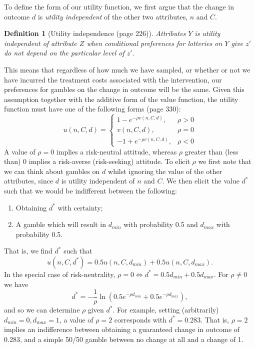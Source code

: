 \documentclass[sagev, Crown]{sagej} %
\newtheorem*{mydef}{Definition}
\begin{document}
To define the form of our utility function, we first argue that the change in outcome $d$ is \emph{utility independent} of the other two attributes, $n$ and $C$. 

\begin{mydef}[Utility independence  \cite{Keeney1976} (page 226)] %
Attributes $Y$ is utility independent of attribute $Z$ when conditional preferences for lotteries on $Y$ give $z'$ do not depend on the particular level of $z'$.
\end{mydef}

This means that regardless of how much we have sampled, or whether or not we have incurred the treatment costs associated with the intervention, our preferences for gambles on the change in outcome will be the same. Given this assumption together with the additive form of the value function, the utility function must have one of the following forms \cite{Keeney1976} (page 330):
\begin{equation}\label{eqn:expo_util}
u(n, C, d) =
\begin{cases}
1 - e^{-\rho v(n, C, d)}, &\rho > 0 \\
v(n, C, d), &\rho = 0 \\
-1 + e^{-\rho v(n, C, d)}, &\rho < 0 
\end{cases}
\end{equation}
A value of $\rho = 0$ implies a risk-neutral attitude, whereas $\rho$ greater than (less than) 0 implies a risk-averse (risk-seeking) attitude. To elicit $\rho$ we first note that we can think about gambles on $d$ whilst ignoring the value of the other attributes, since $d$ is utility independent of $n$ and $C$. We then elicit the value $d^*$ such that we would be indifferent between the following:
\begin{enumerate}
\item Obtaining $d^*$ with certainty;
\item A gamble which will result in $d_{min}$ with probability 0.5 and $d_{max}$ with probability 0.5.
\end{enumerate}
That is, we find $d^*$ such that
$$
u(n, C, d^*) = 0.5u(n, C, d_{min}) + 0.5u(n, C, d_{max}).
$$
In the special case of risk-neutrality, $\rho = 0 \Leftrightarrow d^* = 0.5d_{min} + 0.5d_{max}$. For $\rho \neq 0$ we have
$$
d^* = - \frac{1}{\rho} \ln\left( 0.5e^{-\rho d_{min}} + 0.5e^{-\rho d_{max}} \right),
$$
and so we can determine $\rho$ given $d^*$. For example, setting (arbitrarily) $d_{min} = 0, d_{max} = 1$, a value of $\rho = 2$ corresponds with $d^* =  0.283$. That is, $\rho = 2$ implies an indifference between obtaining a guaranteed change in outcome of 0.283, and a simple 50/50 gamble between no change at all and a change of 1. 
\end{document}
